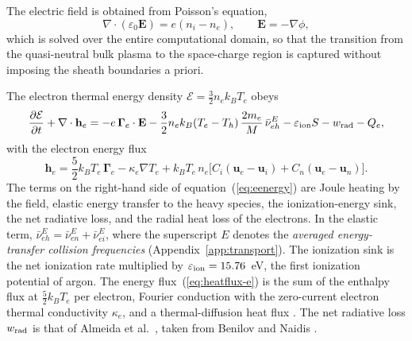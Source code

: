 The electric field is obtained from Poisson's equation,
\begin{equation}
\nabla\cdot(\varepsilon_0\mathbf{E})=e(n_i-n_e),
\qquad
\mathbf{E}=-\nabla\phi,
\label{eq:poisson}
\end{equation}
which is solved over the entire computational domain, so that the transition from the quasi-neutral bulk plasma to the space-charge region is captured without imposing the sheath boundaries a priori.

The electron thermal energy density \(\mathcal{E}=\tfrac32n_ek_BT_e\) obeys
\begin{equation}
\frac{\partial\mathcal{E}}{\partial t}+\nabla\cdot\mathbf{h}_e
=-e\,\boldsymbol{\Gamma}_e\cdot\mathbf{E}
-\frac32n_ek_B(T_e-T_h)\,\frac{2m_e}{M}\,\bar\nu^E_{eh}
-\varepsilon_{\rm ion}S
-w_{\rm rad}
-Q_e ,
\label{eq:eenergy}
\end{equation}
with the electron energy flux
\begin{equation}
\mathbf{h}_e=\frac52k_BT_e\,\boldsymbol{\Gamma}_e
-\kappa_e\nabla T_e
+k_BT_e\,n_e\Big[C_i(\mathbf{u}_e-\mathbf{u}_i)+C_n(\mathbf{u}_e-\mathbf{u}_n)\Big].
\label{eq:heatflux-e}
\end{equation}
The terms on the right-hand side of equation~(\ref{eq:eenergy}) are Joule heating by the field, elastic energy transfer to the heavy species, the ionization-energy sink, the net radiative loss, and the radial heat loss of the electrons. In the elastic term, \(\bar\nu^E_{eh}=\bar\nu^E_{en}+\bar\nu^E_{ei}\), where the superscript \(E\) denotes the \emph{averaged energy-transfer collision frequencies} (Appendix~\ref{app:transport}). The ionization sink is the net ionization rate multiplied by \(\varepsilon_{\rm ion}=15.76\)~eV, the first ionization potential of argon. The energy flux~(\ref{eq:heatflux-e}) is the sum of the enthalpy flux at \(\tfrac52k_BT_e\) per electron, Fourier conduction with the zero-current electron thermal conductivity \(\kappa_e\), and a thermal-diffusion heat flux \cite{zhdanov2002transport}. The net radiative loss \(w_{\rm rad}\) is that of Almeida et al.\ \cite{Almeida2008}, taken from Benilov and Naidis \cite{benilov1998ionization}.

